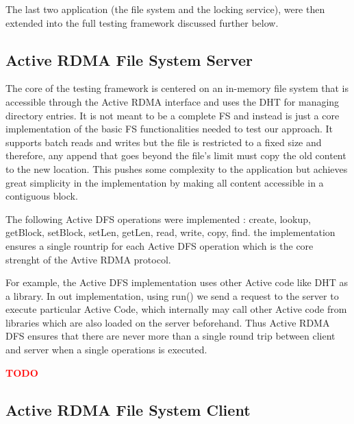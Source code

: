 \documentclass[10pt]{article}
\newcommand{\PROBLEM}[1] {\textbf{\textcolor{red}{#1}}}
\begin{document}
The last two application (the file system and the locking service), were then extended into the full testing framework discussed further below.

\subsection{Active RDMA File System Server}

The core of the testing framework is centered on an in-memory file system that is accessible through the Active RDMA interface and uses the DHT for managing directory entries. It is not meant to be a complete FS and instead is just a core implementation of the basic FS functionalities needed to test our approach. It supports batch reads and writes but the file is restricted to a fixed size and therefore, any append that goes beyond the file's limit must copy the old content to the new location. This pushes some complexity to the application but achieves great simplicity in the implementation by making all content accessible in a contiguous block.

The following Active DFS operations were implemented : create, lookup, getBlock, setBlock, setLen, getLen, read, write, copy, find. the implementation ensures a single rountrip for each Active DFS operation which is the core strenght of the Avtive RDMA protocol.

For example, the Active DFS implementation uses other Active code like DHT as a library. In out implementation, using run() we send a request to the server to execute particular Active Code, which internally may call other Active code from libraries which are also loaded on the server beforehand. Thus Active RDMA DFS ensures that there are never more than a single round trip between client and server when a single operations is executed. 

\PROBLEM{TODO}

\subsection{Active RDMA File System Client}
\end{document}
